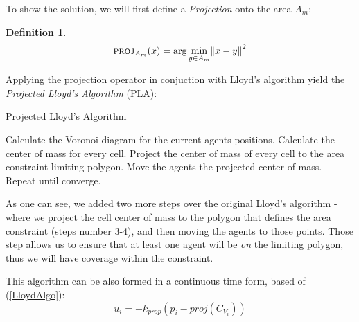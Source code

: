 \documentclass{iacas}
\newtheorem{definition}{Definition}
\begin{document}
To show the solution, we will first define a \emph{Projection} onto the area $A_m$:
\begin{definition}
$$\textsc{proj}_{A_m}(x) = \arg\min_{y \in A_m} \norm{x-y}^2$$
\label{def:projection operator}
\end{definition}

Applying the projection operator in conjuction with Lloyd's algorithm yield the \emph{Projected Lloyd's Algorithm} (PLA):
\begin{algorithm}
\caption{Projected Lloyd's Algorithm}\label{ProjLloydsAlgorithm}
\begin{algorithmic}[1]
\State Calculate the Voronoi diagram for the current agents positions.
\State Calculate the center of mass for every cell.
\State Project the center of mass of every cell to the area constraint limiting polygon.
\State Move the agents the projected center of mass.
\State Repeat until converge.
\end{algorithmic}
\label{algo:PLA}
\end{algorithm}

As one can see, we added two more steps over the original Lloyd's algorithm - where we project the cell center of mass to the polygon that defines the area constraint (steps number 3-4), and then moving the agents to those points. Those step allows us to ensure that at least one agent will be \emph{on} the limiting polygon, thus we will have coverage within the constraint.

This algorithm can be also formed in a continuous time form, based of (\ref{LloydAlgo}):
\begin{equation} \label{ProjectedLloydsContol}
u_{i} = -k_{prop}\left( p_i - \textit{proj}\left( C_{V_{i}} \right) \right)
\end{equation} 
\end{document}
